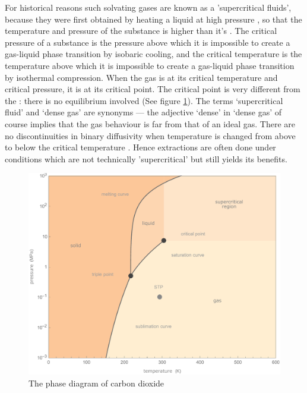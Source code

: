 For historical reasons such solvating gases are known as a 'supercritical
fluids', because they were first obtained by heating a liquid at high pressure
\autocite{Berche2009}, so that the temperature and pressure of the substance is
higher than it's . The critical pressure of a substance
is the pressure above which it is impossible to create a gas-liquid phase
transition by isobaric cooling, and the critical temperature is the temperature
above which it is impossible to create a gas-liquid phase transition by
isothermal compression. When the gas is at its critical temperature and critical
pressure, it is at its critical point. The critical point is very different from
the : there is no equilibrium involved (See figure
\ref{fig:co2phase}). The terms `supercritical fluid' and `dense gas' are
synonyms \autocite{Randall1982} --- the adjective `dense' in `dense gas' of
course implies that the gas behaviour is far from that of an ideal gas. There
are no discontinuities in binary diffusivity when temperature is changed from
above to below the critical temperature \autocite{Lauer1983}. Hence extractions
are often done under conditions which are not technically 'supercritical' but
still yields its benefits.

\begin{figure}
\centering
\includegraphics[width=\textwidth]{Figures/CO2PhaseDiagram}
\decoRule
\caption[The carbon dioxide phase diagram]{The phase diagram of carbon dioxide}
\label{fig:co2phase}
\end{figure}


